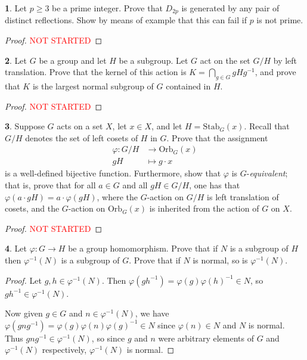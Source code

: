 \documentclass[12pt]{article}
\theoremstyle{definition}
\newtheorem{ex}{}
\begin{document}
\begin{ex}
	Let $p \geq 3$ be a prime integer.
	Prove that $D_{2p}$ is generated by any pair of distinct reflections.
	Show by means of example that this can fail if $p$ is not prime.
\end{ex}
\begin{proof}
	\textcolor{red}{NOT STARTED}
\end{proof}

\begin{ex}
	Let $G$ be a group and let $H$ be a subgroup.
	Let $G$ act on the set $G/H$ by left translation.
	Prove that the kernel of this action is $K = \bigcap_{g \in G} gHg^{-1}$, and prove that $K$ is the largest normal subgroup of $G$ contained in $H$.
\end{ex}
\begin{proof}
	\textcolor{red}{NOT STARTED}
\end{proof}

\begin{ex}
	Suppose $G$ acts on a set $X$, let $x \in X$, and let $H = \mathrm{Stab}_G(x)$.
	Recall that $G/H$ denotes the set of left cosets of $H$ in $G$.
	Prove that the assignment \begin{align*}
		\varphi: G/H & \to \mathrm{Orb}_G(x) \\
		gH           & \mapsto g\cdot x
	\end{align*}
	is a well-defined bijective function.
	Furthermore, show that $\varphi$ is $G$-\textit{equivalent}; that is, prove that for all $a \in G$ and all $gH \in G/H$, one has that $\varphi(a \cdot gH) = a \cdot \varphi(gH)$, where the $G$-action on $G/H$ is left translation of cosets, and the $G$-action on $\mathrm{Orb}_G(x)$ is inherited from the action of $G$ on $X$.
\end{ex}
\begin{proof}
	\textcolor{red}{NOT STARTED}
\end{proof}

\begin{ex}
	Let $\varphi: G \to H$ be a group homomorphism.
	Prove that if $N$ is a subgroup of $H$ then $\varphi^{-1}(N)$ is a subgroup of $G$.
	Prove that if $N$ is normal, so is $\varphi^{-1}(N)$.
\end{ex}
\begin{proof}
	Let $g, h \in \varphi^{-1}(N)$.
	Then $\varphi(gh^{-1}) = \varphi(g)\varphi(h)^{-1} \in N$, so $gh^{-1} \in \varphi^{-1}(N)$.

	Now given $g \in G$ and $n \in \varphi^{-1}(N)$, we have $\varphi(gng^{-1}) = \varphi(g)\varphi(n)\varphi(g)^{-1} \in N$ since $\varphi(n) \in N$ and $N$ is normal.
	Thus $gng^{-1} \in \varphi^{-1}(N)$, so since $g$ and $n$ were arbitrary elements of $G$ and $\varphi^{-1}(N)$ respectively, $\varphi^{-1}(N)$ is normal.
\end{proof}
\end{document}
